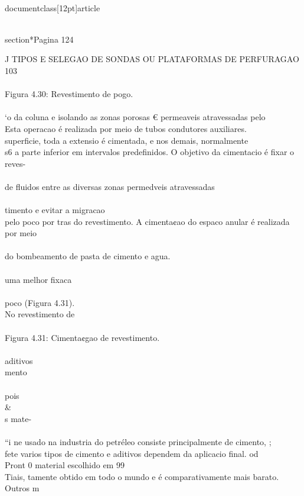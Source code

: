 \\documentclass[12pt]{article}
\begin{document}
\\section*{Pagina 124}

J TIPOS E SELEGAO DE SONDAS OU PLATAFORMAS DE PERFURAGAO 103\\
\\
Figura 4.30: Revestimento de pogo.\\
\\
‘o da coluna e isolando as zonas porosas € permeaveis atravessadas pelo\\
Esta operacao é realizada por meio de tubos condutores auxiliares.\\
superficie, toda a extensio é cimentada, e nos demais, normalmente\\
s6 a parte inferior em intervalos predefinidos. O objetivo da cimentacio é fixar o reves-\\
\\
de fluidos entre as diversas zonas permedveis atravessadas\\
\\
timento e evitar a migracao\\
pelo poco por tras do revestimento. A cimenta¢ao do espaco anular é realizada por meio\\
\\
do bombeamento de pasta de cimento e agua.\\
\\
uma melhor fixaca\\
\\
poco (Figura 4.31).\\
No revestimento de\\
\\
Figura 4.31: Cimenta¢gao de revestimento.\\
\\
aditivos\\
mento\\
\\
pois \\&\\
s mate-\\
\\
“i ne usado na industria do petréleo consiste principalmente de cimento, ;\\
fete varios tipos de cimento e aditivos dependem da aplicacio final. od\\
Pront 0 material escolhido em 99\\%
Tiais, tamente obtido em todo o mundo e é comparativamente mais barato. Outros m\\
\end{document}
